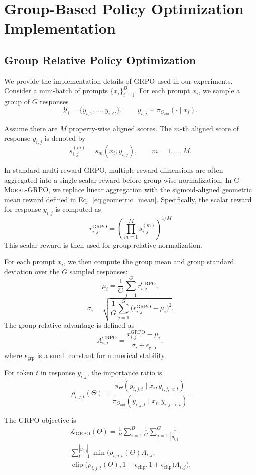 \documentclass[11pt]{article}
\begin{document}
\section{Group-Based Policy Optimization Implementation}
\subsection{Group Relative Policy Optimization}
\label{appendix:grpo_implementation}
We provide the implementation details of GRPO used in our experiments.
Consider a mini-batch of prompts $\{x_i\}_{i=1}^{B}$.
For each prompt $x_i$, we sample a group of $G$ responses
\[
\mathcal{Y}_i = \{y_{i,1}, \dots, y_{i,G}\},
\qquad
y_{i,j} \sim \pi_{\Theta_{\mathrm{old}}}(\cdot \mid x_i).
\]

Assume there are $M$ property-wise aligned scores.
The $m$-th aligned score of response $y_{i,j}$ is denoted by
\[
s_{i,j}^{(m)} = s_m(x_i, y_{i,j}),
\qquad
m = 1, \dots, M.
\]

In standard multi-reward GRPO, multiple reward dimensions are often aggregated into a single scalar reward before group-wise normalization. 
In \textsc{C-Moral}-GRPO, we replace linear aggregation with the sigmoid-aligned geometric mean reward defined in Eq.~\ref{eq:geometric_mean}. 
Specifically, the scalar reward for response $y_{i,j}$ is computed as
\[
r_{i,j}^{\mathrm{GRPO}}
=
\left(
\prod_{m=1}^{M} s_{i,j}^{(m)}
\right)^{1/M}
\]
This scalar reward is then used for group-relative normalization.

For each prompt $x_i$, we then compute the group mean and group standard deviation over the $G$ sampled responses:
\[
\mu_i
=
\frac{1}{G} \sum_{j=1}^{G} r_{i,j}^{\mathrm{GRPO}},
\]
\[
\sigma_i
=
\sqrt{
\frac{1}{G} \sum_{j=1}^{G}
\bigl(r_{i,j}^{\mathrm{GRPO}} - \mu_i\bigr)^2
}.
\]
The group-relative advantage is defined as
\[
A_{i,j}^{\mathrm{GRPO}}
=
\frac{r_{i,j}^{\mathrm{GRPO}} - \mu_i}{\sigma_i + \epsilon_{\mathrm{grp}}},
\]
where $\epsilon_{\mathrm{grp}}$ is a small constant for numerical stability.

For token $t$ in response $y_{i,j}$, the importance ratio is
\[
\rho_{i,j,t}(\Theta)
=
\frac{
\pi_{\Theta}(y_{i,j,t} \mid x_i, y_{i,j,<t})
}{
\pi_{\Theta_{\mathrm{old}}}(y_{i,j,t} \mid x_i, y_{i,j,<t})
}.
\]

The GRPO objective is
\[
\begin{split}
\mathcal{L}_{\mathrm{GRPO}}(\Theta)
=
\frac{1}{B} \sum_{i=1}^{B}
\frac{1}{G} \sum_{j=1}^{G}
\frac{1}{|y_{i,j}|} \\\sum_{t=1}^{|y_{i,j}|}
\min\Big(
\rho_{i,j,t}(\Theta)A_{i,j},
\\
\operatorname{clip}\big(\rho_{i,j,t}(\Theta),1-\epsilon_{\mathrm{clip}},1+\epsilon_{\mathrm{clip}}\big)
A_{i,j}
\Big).
\end{split}
\]
\end{document}
